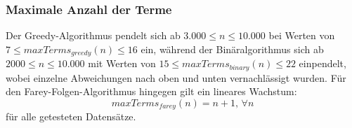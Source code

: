 

\subsubsection{Maximale Anzahl der Terme}
 Der Greedy-Algorithmus pendelt sich ab $3.000 \leq n \leq 10.000$ bei Werten von $7 \leq maxTerms_{greedy}(n) \leq 16$ ein, während der Binäralgorithmus sich ab $2000 \leq n \leq 10.000$ mit Werten von $15 \leq maxTerms_{binary}(n) \leq 22$ einpendelt, wobei einzelne Abweichungen nach oben und unten vernachlässigt wurden. Für den Farey-Folgen-Algorithmus hingegen gilt ein lineares Wachstum:
$$maxTerms_{farey}(n) = n + 1, \, \forall n$$
für alle getesteten Datensätze. 


